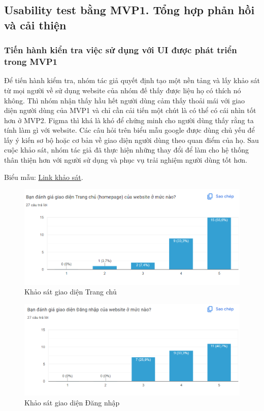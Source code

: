 \subsection{Usability test bằng MVP1. Tổng hợp phản hồi và cải thiện}
\subsubsection{Tiến hành kiển tra việc sử dụng với UI được phát triển trong MVP1}
Để tiến hành kiểm tra, nhóm tác giả quyết định tạo một nền tảng và lấy khảo sát từ mọi người về sử dụng website của nhóm đế thấy được liệu họ có thích nó không. Thì nhóm nhận thấy hầu hết người dùng cảm thấy thoải mái với giao diện người dùng của MVP1 và chỉ cần cải tiến một chút là có thể có cái nhìn tốt hơn ở MVP2. Figma thì khá là khó để chứng minh cho người dùng thấy rằng ta tính làm gì với website. Các câu hỏi trên biểu mẫu google được dùng chủ yếu để lấy ý kiến sơ bộ hoặc cơ bản về giao diện người dùng theo quan điểm của họ. Sau cuộc khảo sát, nhóm tác giả đã thực hiện những thay đổi để làm cho hệ thống thân thiện hơn với người sử dụng và phục vụ trải nghiệm người dùng tốt hơn.\par
Biểu mẫu: 
\href{https://docs.google.com/forms/d/e/1FAIpQLSejZuRVfBreTUDDnRW45Cg20We1oYlPJiCv3Yp35g0XOEqzxw/viewform?fbclid=IwAR1cAii_2AATn-scg2h8SiijKK27mD7wnDgE8fzifFTZD-0UNnXU7ai2E8E}{Link khảo sát}.
\begin{figure}[H]
    \begin{center}
        \includegraphics[width=1\textwidth]{Images/Test/test1.png}
        \caption{Khảo sát giao diện Trang chủ}
    \end{center}
\end{figure}
\begin{figure}[H]
    \begin{center}
        \includegraphics[width=1\textwidth]{Images/Test/test2.png}
        \caption{Khảo sát giao diện Đăng nhập}
    \end{center}
\end{figure}
